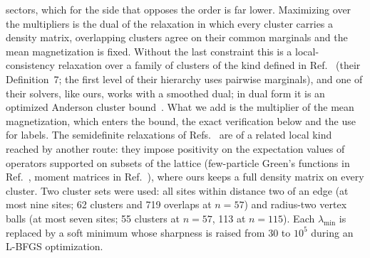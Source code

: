 \documentclass[aps,prx,onecolumn,10pt,nofootinbib,longbibliography,floatfix]{revtex4-2}
\theoremstyle{remark}
\begin{document}
sectors, which for the side that opposes the order is far lower. Maximizing over the
multipliers is the dual of the relaxation in which every cluster carries a density matrix, overlapping clusters
agree on their common marginals and the mean magnetization is fixed. Without the last constraint this is a
local-consistency relaxation over a family of clusters of the kind defined in Ref.~\cite{lin2026} (their Definition~7; %
the first level of their hierarchy uses pairwise marginals), and one of their solvers, like ours, works with a
smoothed dual; in dual form it is an optimized Anderson cluster bound~\cite{anderson1951}. What we add is the multiplier of the mean
magnetization, which enters the bound, the exact verification below and the use for labels. The semidefinite
relaxations of Refs.~\cite{barthel2012,baumgratz2012} are of a related local kind reached by another route: they
impose positivity on the expectation values of operators supported on subsets of the lattice (few-particle Green's
functions in Ref.~\cite{barthel2012}, moment matrices in Ref.~\cite{baumgratz2012}), where ours keeps a full density
matrix on every cluster. Two cluster sets were used: %
all sites within distance two of an edge (at most nine sites; 62 clusters and 719 overlaps at $n=57$) and radius-two %
vertex balls (at most seven sites; 55 clusters at $n=57$, 113 at $n=115$). Each $\lambda_{\min}$ is replaced by a soft %
minimum whose sharpness is raised from $30$ to $10^5$ during an L-BFGS optimization. %
\end{document}
